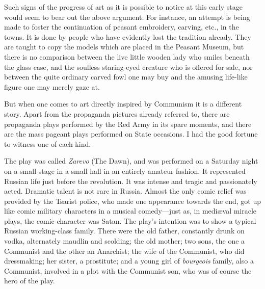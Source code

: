 Such signs of the progress of art as it is possible to notice at this early stage would seem to bear out the above argument. For instance, an attempt is being made to foster the continuation of peasant embroidery, carving, etc., in the towns. It is done by people who have evidently lost the tradition already. They are taught to copy the models which are placed in the Peasant Museum, but there is no comparison between the live little wooden lady who smiles beneath the glass case, and the soulless staring-eyed creature who is offered for sale, nor between the quite ordinary carved fowl one may buy and the amusing life-like figure one may merely gaze at.

But when one comes to art directly inspired by Communism it is a different story. Apart from the propaganda pictures already referred to, there are propaganda plays performed by the Red Army in its spare moments, and there are the mass pageant plays performed on State occasions. I had the good fortune to witness one of each kind.

The play was called \emph{Zarevo} (The Dawn), and was performed on a Saturday night on a small stage in a small hall in an entirely amateur fashion. It represented Russian life just before the revolution. It was intense and tragic and passionately acted. Dramatic talent is not rare in Russia. Almost the only comic relief was provided by the Tsarist police, who made one appearance towards the end, got up like comic military characters in a musical comedy---just as, in mediæval miracle plays, the comic character was Satan. The play's intention was to show a typical Russian working-class family. There were the old father, constantly drunk on vodka, alternately maudlin and scolding; the old mother; two sons, the one a Communist and the other an Anarchist; the wife of the Communist, who did dressmaking; her sister, a prostitute; and a young girl of \emph{bourgeois} family, also a Communist, involved in a plot with the Communist son, who was of course the hero of the play.

